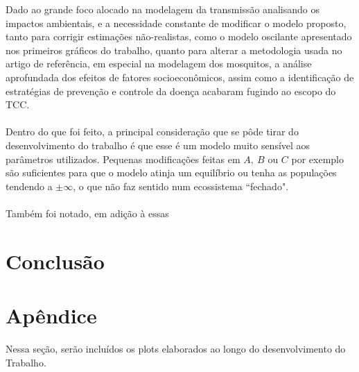 \documentclass[12pt]{article}
\begin{document}
Dado ao grande foco alocado na modelagem da transmissão analisando os impactos ambientais, e a necessidade constante de modificar o modelo proposto, tanto para corrigir estimações não-realistas, como o modelo oscilante apresentado nos primeiros gráficos do trabalho, quanto para alterar a metodologia usada no artigo de referência, em especial na modelagem dos mosquitos, a análise aprofundada dos efeitos de fatores socioeconômicos, assim como a identificação de estratégias de prevenção e controle da doença acabaram fugindo ao escopo do TCC.
\\\\
Dentro do que foi feito, a principal consideração que se pôde tirar do desenvolvimento do trabalho é que esse é um modelo muito sensível aos parâmetros utilizados. Pequenas modificações feitas em $A, \ B$ ou $C$ por exemplo são suficientes para que o modelo atinja um equilíbrio ou tenha as populações tendendo a $\pm \infty$, o que não faz sentido num ecossistema ``fechado". 
\\\\
Também foi notado, em adição à essas  

\newpage
\section{Conclusão}

\newpage
\section{Apêndice}
Nessa seção, serão incluídos os plots elaborados ao longo do desenvolvimento do Trabalho.
\end{document}
